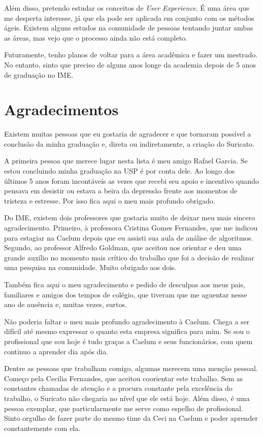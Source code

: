 \documentclass[titlepage,a4paper]{article}
\newcommand{\suricato}{Suricato}
\begin{document}
Além disso, pretendo estudar os conceitos de \textit{User Experience}. É uma área que me desperta interesse, já que ela pode ser aplicada em conjunto com os métodos ágeis. Existem alguns estudos na comunidade de pessoas tentando juntar ambas as áreas, mas vejo que o processo ainda não está completo.

Futuramente, tenho planos de voltar para a área acadêmica e fazer um mestrado. No entanto, sinto que preciso de alguns anos longe da academia depois de 5 anos de graduação no IME.

\section{Agradecimentos}

Existem muitas pessoas que eu gostaria de agradecer e que tornaram possível a conclusão da minha graduação e, direta ou indiretamente, a criação do \suricato{}.

A primeira pessoa que merece lugar nesta lista é meu amigo Rafael Garcia. Se estou concluindo minha graduação na USP é por conta dele. Ao longo dos últimos 5 anos foram incontáveis as vezes que recebi seu apoio e incentivo quando pensava em desistir ou estava a beira da depressão frente aos momentos de tristeza e estresse. Por isso fica aqui o meu mais profundo obrigado.

Do IME, existem dois professores que gostaria muito de deixar meu mais sincero agradecimento. Primeiro, à professora Cristina Gomes Fernandes, que me indicou para estagiar na Caelum depois que eu assisti sua aula de análise de algoritmos. Segundo, ao professor Alfredo Goldman, que aceitou nos orientar e deu uma grande auxílio no momento mais crítico do trabalho que foi a decisão de realizar uma pesquisa na comunidade. Muito obrigado aos dois.

Também fica aqui o meu agradecimento e pedido de desculpas aos meus pais, familiares e amigos dos tempos de colégio, que tiveram que me aguentar nesse ano de ausência e, muitas vezes, surtos. 

Não poderia faltar o meu mais profundo agradecimento à Caelum. Chega a ser difícil até mesmo expressar o quanto esta empresa significa para mim. Se sou o profissional que sou hoje é tudo graças a Caelum e seus funcionários, com quem continuo a aprender dia após dia. 

Dentre as pessoas que trabalham comigo, algumas merecem uma menção pessoal. Começo pela Cecilia Fernandes, que aceitou coorientar este trabalho. Sem as constantes chamadas de atenção e a procura constante pela excelência do trabalho, o \suricato{} não chegaria no nível que ele está hoje. Além disso, é uma pessoa exemplar, que particularmente me serve como espelho de profissional. Sinto orgulho de fazer parte do mesmo time da Ceci na Caelum e poder aprender constantemente com ela.
\end{document}
